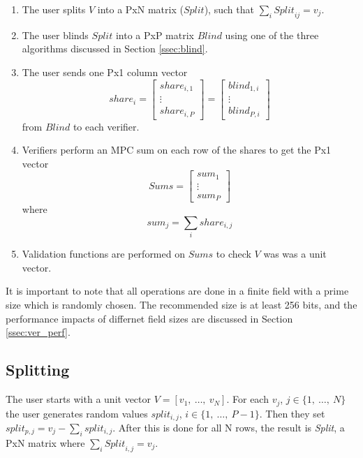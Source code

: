 \documentclass[conference]{IEEEtran}
\begin{document}
\begin{enumerate}
	\item The user splits $\textit{V}$ into a PxN matrix ($Split$), such that $\sum_i \textit{Split}_{ij} = v_j$.\\
	\item The user blinds $\textit{Split}$ into a PxP matrix $\textit{Blind}$ using one of the three algorithms discussed in Section \ref{ssec:blind}.\\
	\item The user sends one Px1 column vector\\
	\begin{equation*}
	\mathit{share_i} = \begin{bmatrix}
		share_{i,1} \\
		\vdots \\
		share_{i,P}
	\end{bmatrix}
	= \begin{bmatrix}
		blind_{1,i} \\
		\vdots \\
		blind_{P,i}
	\end{bmatrix}
	\end{equation*}
	from $\textit{Blind}$ to each verifier.\\
	\item Verifiers perform an MPC sum on each row of the shares to get the Px1 vector
	\begin{equation*}
		Sums =
		\begin{bmatrix}
			sum_1\\
			\vdots\\
			sum_P 
		\end{bmatrix}
	\end{equation*}
	where
	\begin{equation*}
		sum_j = \sum_i share_{i,j}
	\end{equation*}
	\item Validation functions are performed on $\textit{Sums}$ to check $\textit{V}$ was was a unit vector.\\
\end{enumerate}

It is important to note that all operations are done in a finite field with a prime size which is randomly chosen. The recommended size is at least 256 bits, and the performance impacts of differnet field sizes are discussed in Section \ref{ssec:ver_perf}.\\

\subsection{Splitting}
The user starts with a unit vector $\textit{V} = [v_1,~\dots,~v_N]$. For each $v_j$, $j \in \{1,~\dots,~N\}$ the user generates random values $split_{i,j}$, $i \in  \{1,~\dots,~P-1\}$. Then they set $split_{p,j} = v_j - \sum_i split_{i,j}$. After this is done for all N rows, the result is \textit{Split}, a PxN matrix where $\sum_i \textit{Split}_{i,j} = v_j$.\\
\end{document}
